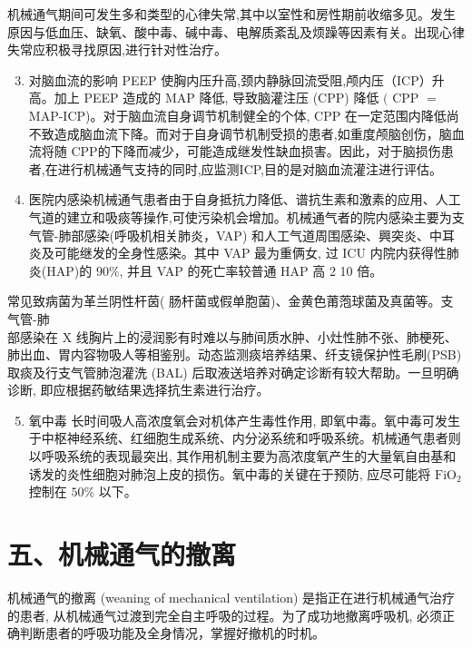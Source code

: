 \documentclass[10pt]{article}
\begin{document}
机械通气期间可发生多和类型的心律失常,其中以室性和房性期前收缩多见。发生原因与低血压、缺氧、酸中毒、碱中毒、电解质紊乱及烦躁等因素有关。出现心律失常应积极寻找原因,进行针对性治疗。

\begin{enumerate}
  \setcounter{enumi}{2}
  \item 对脑血流的影响 PEEP 使胸内压升高,颈内静脉回流受阻,颅内压（ICP）升高。加上 PEEP 造成的 MAP 降低, 导致脑灌注压 (CPP) 降低 $($ CPP $=$ MAP-ICP)。对于脑血流自身调节机制健全的个体, CPP 在一定范围内降低尚不致造成脑血流下降。而对于自身调节机制受损的患者,如重度颅脑创伤，脑血流将随 CPP的下降而减少，可能造成继发性缺血损害。因此，对于脑损伤患者,在进行机械通气支持的同时,应监测ICP,目的是对脑血流灌注进行评估。

  \item 医院内感染机械通气患者由于自身抵抗力降低、谱抗生素和激素的应用、人工气道的建立和吸痰等操作,可使污染机会增加。机械通气者的院内感染主要为支气管-肺部感染(呼吸机相关肺炎，VAP) 和人工气道周围感染、興突炎、中耳炎及可能继发的全身性感染。其中 VAP 最为重俩女, 过 ICU 内院内获得性肺炎(HAP)的 $90 \%$, 并且 VAP 的死亡率较普通 HAP 高 2 10 倍。

\end{enumerate}

常见致病菌为革兰阴性杆茵( 肠杆菌或假单胞菌)、金黄色莆萢球菌及真菌等。支气管-肺\\
部感染在 $\mathrm{X}$ 线胸片上的浸润影有时难以与肺间质水肿、小灶性肺不张、肺梗死、肺出血、胃内容物吸人等相鉴别。动态监测痰培养结果、纤支镜保护性毛刷(PSB) 取痰及行支气管肺泡灌洗 (BAL) 后取液送培养对确定诊断有较大帮助。一旦明确诊断, 即应根据药敏结果选择抗生素进行治疗。

\begin{enumerate}
  \setcounter{enumi}{4}
  \item 氧中毒 长时间吸人高浓度氧会对机体产生毒性作用, 即氧中毒。氧中毒可发生于中枢神经系统、红细胞生成系统、内分泌系统和呼吸系统。机械通气患者则以呼吸系统的表现最突出, 其作用机制主要为高浓度氧产生的大量氧自由基和诱发的炎性细胞对肺泡上皮的损伤。氧中毒的关键在于预防, 应尽可能将 $\mathrm{FiO}_{2}$ 控制在 $50 \%$ 以下。
\end{enumerate}

\section*{五、机械通气的撤离}
机械通气的撤离 (weaning of mechanical ventilation) 是指正在进行机械通气治疗的患者, 从机械通气过渡到完全自主呼吸的过程。为了成功地撤离呼吸机, 必须正确判断患者的呼吸功能及全身情况，掌握好撤机的时机。
\end{document}
